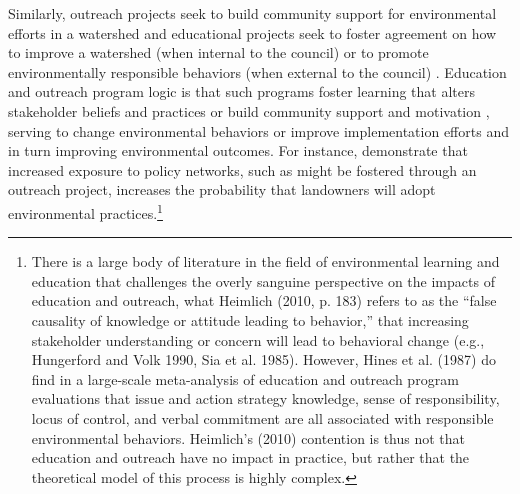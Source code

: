 \documentclass[11pt,a4paper,titlepage]{article}
\begin{document}
Similarly, outreach projects seek to build community support for environmental efforts in a watershed \parencite{huntington2000} and educational projects seek to foster agreement on how to improve a watershed (when internal to the council) \parencite{leach2002} or to promote environmentally responsible behaviors (when external to the council) \parencite{nikolic2008}. Education and outreach program logic is that such programs foster learning that alters stakeholder beliefs and practices \parencite[e.g.,][]{leach2013,leach2002} or build community support and motivation \parencite{huntington2000,emerson2012}, serving to change environmental behaviors or improve implementation efforts and in turn improving environmental outcomes. For instance, \textcite{lubell2008} demonstrate that increased exposure to policy networks, such as might be fostered through an outreach project, increases the probability that landowners will adopt environmental practices.\footnote{There is a large body of literature in the field of environmental learning and education that challenges the overly sanguine perspective on the impacts of education and outreach, what Heimlich (2010, p. 183) refers to as the “false causality of knowledge or attitude leading to behavior,” that increasing stakeholder understanding or concern will lead to behavioral change (e.g., Hungerford and Volk 1990, Sia et al. 1985). However, Hines et al. (1987) do find in a large-scale meta-analysis of education and outreach program evaluations that issue and action strategy knowledge, sense of responsibility, locus of control, and verbal commitment are all associated with responsible environmental behaviors. Heimlich’s (2010) contention is thus not that education and outreach have no impact in practice, but rather that the theoretical model of this process is highly complex.} 
\end{document}
